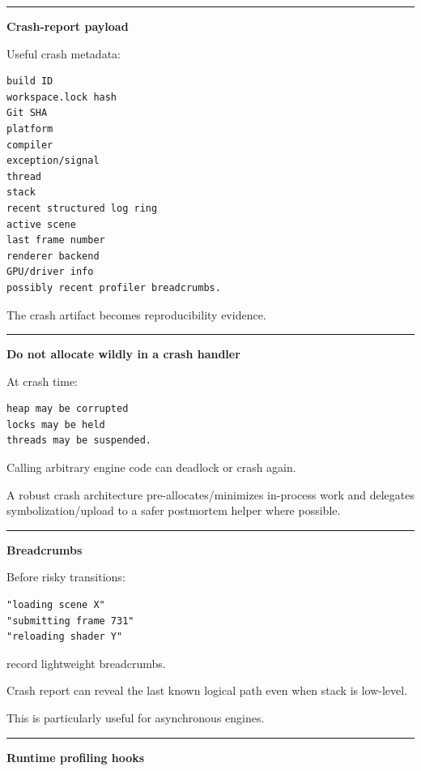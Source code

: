 \begin{center}\rule{0.5\linewidth}{0.5pt}\end{center}

\textbf{Crash-report payload}

Useful crash metadata:

\begin{verbatim}
build ID
workspace.lock hash
Git SHA
platform
compiler
exception/signal
thread
stack
recent structured log ring
active scene
last frame number
renderer backend
GPU/driver info
possibly recent profiler breadcrumbs.
\end{verbatim}

The crash artifact becomes reproducibility evidence.

\begin{center}\rule{0.5\linewidth}{0.5pt}\end{center}

\textbf{Do not allocate wildly in a crash handler}

At crash time:

\begin{verbatim}
heap may be corrupted
locks may be held
threads may be suspended.
\end{verbatim}

Calling arbitrary engine code can deadlock or crash again.

A robust crash architecture pre-allocates/minimizes in-process work and delegates symbolization/upload to a safer postmortem helper where possible.

\begin{center}\rule{0.5\linewidth}{0.5pt}\end{center}

\textbf{Breadcrumbs}

Before risky transitions:

\begin{verbatim}
"loading scene X"
"submitting frame 731"
"reloading shader Y"
\end{verbatim}

record lightweight breadcrumbs.

Crash report can reveal the last known logical path even when stack is low-level.

This is particularly useful for asynchronous engines.

\begin{center}\rule{0.5\linewidth}{0.5pt}\end{center}

\textbf{Runtime profiling hooks}


